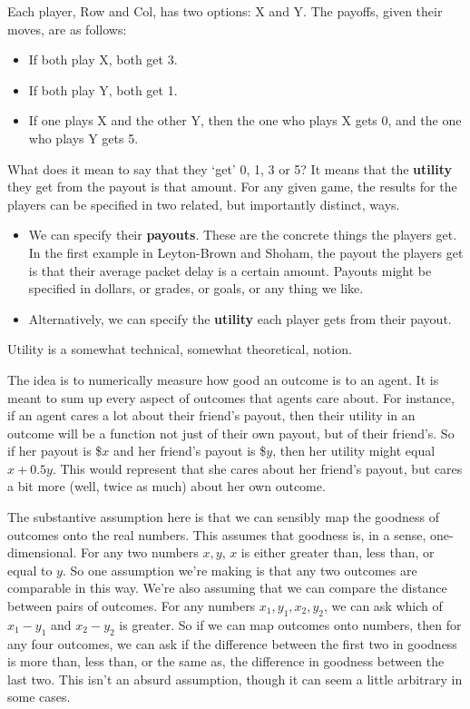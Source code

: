 \documentclass[openany]{book}
\begin{document}
\noindent Each player, Row and Col, has two options: X and Y. The payoffs, given their moves, are as follows:

\begin{itemize}
\item If both play X, both get 3.
\item If both play Y, both get 1.
\item If one plays X and the other Y, then the one who plays X gets 0, and the one who plays Y gets 5.	
\end{itemize}

\noindent What does it mean to say that they `get' 0, 1, 3 or 5? It means that the \textbf{utility} they get from the payout is that amount. For any given game, the results for the players can be specified in two related, but importantly distinct, ways.

\begin{itemize}
\item We can specify their \textbf{payouts}. These are the concrete things the players get. In the first example in Leyton-Brown and Shoham, the payout the players get is that their average packet delay is a certain amount. Payouts might be specified in dollars, or grades, or goals, or any thing we like.
\item Alternatively, we can specify the \textbf{utility} each player gets from their payout.
\end{itemize}
Utility is a somewhat technical, somewhat theoretical, notion. 

The idea is to numerically measure how good an outcome is to an agent. It is meant to sum up every aspect of outcomes that agents care about. For instance, if an agent cares a lot about their friend's payout, then their utility in an outcome will be a function not just of their own payout, but of their friend's. So if her payout is \$$x$ and her friend's payout is \$$y$, then her utility might equal $x + 0.5y$. This would represent that she cares about her friend's payout, but cares a bit more (well, twice as much) about her own outcome.

The substantive assumption here is that we can sensibly map the goodness of outcomes onto the real numbers. This assumes that goodness is, in a sense, one-dimensional. For any two numbers $x, y$, $x$ is either greater than, less than, or equal to $y$. So one assumption we're making is that any two outcomes are comparable in this way. We're also assuming that we can compare the distance between pairs of outcomes. For any numbers $x_1, y_1, x_2, y_2$, we can ask which of $x_1 - y_1$ and $x_2 - y_2$ is greater. So if we can map outcomes onto numbers, then for any four outcomes, we can ask if the difference between the first two in goodness is more than, less than, or the same as, the difference in goodness between the last two. This isn't an absurd assumption, though it can seem a little arbitrary in some cases.
\end{document}
